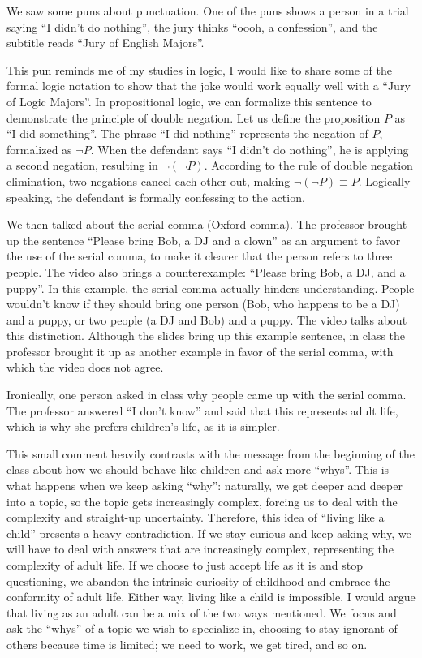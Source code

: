 We saw some puns about punctuation. One of the puns shows a person in a trial saying ``I didn't do nothing'', the jury thinks ``oooh, a confession'', and the subtitle reads ``Jury of English Majors''. 

This pun reminds me of my studies in logic, I would like to share some of the formal logic notation to show that the joke would work equally well with a ``Jury of Logic Majors''. In propositional logic, we can formalize this sentence to demonstrate the principle of double negation. Let us define the proposition $P$ as ``I did something''. The phrase ``I did nothing'' represents the negation of $P$, formalized as $\neg P$. When the defendant says ``I didn't do nothing'', he is applying a second negation, resulting in $\neg(\neg P)$. According to the rule of double negation elimination, two negations cancel each other out, making $\neg(\neg P) \equiv P$. Logically speaking, the defendant is formally confessing to the action. 

We then talked about the serial comma (Oxford comma). The professor brought up the sentence ``Please bring Bob, a DJ and a clown'' as an argument to favor the use of the serial comma, to make it clearer that the person refers to three people. The video also brings a counterexample: ``Please bring Bob, a DJ, and a puppy''. In this example, the serial comma actually hinders understanding. People wouldn't know if they should bring one person (Bob, who happens to be a DJ) and a puppy, or two people (a DJ and Bob) and a puppy. The video talks about this distinction. Although the slides bring up this example sentence, in class the professor brought it up as another example in favor of the serial comma, with which the video does not agree.

Ironically, one person asked in class why people came up with the serial comma. The professor answered ``I don't know'' and said that this represents adult life, which is why she prefers children's life, as it is simpler.

This small comment heavily contrasts with the message from the beginning of the class about how we should behave like children and ask more ``whys''. This is what happens when we keep asking ``why'': naturally, we get deeper and deeper into a topic, so the topic gets increasingly complex, forcing us to deal with the complexity and straight-up uncertainty. Therefore, this idea of ``living like a child'' presents a heavy contradiction. If we stay curious and keep asking why, we will have to deal with answers that are increasingly complex, representing the complexity of adult life. If we choose to just accept life as it is and stop questioning, we abandon the intrinsic curiosity of childhood and embrace the conformity of adult life. Either way, living like a child is impossible. I would argue that living as an adult can be a mix of the two ways mentioned. We focus and ask the ``whys'' of a topic we wish to specialize in, choosing to stay ignorant of others because time is limited; we need to work, we get tired, and so on. 

